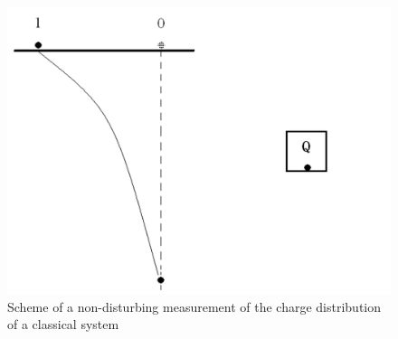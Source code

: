 \begin{center} 
\begin{figure}[h]\label{cmc}

\includegraphics[scale=0.39]{fig61.jpg}


\caption{Scheme of a non-disturbing measurement of the charge distribution of a classical system}

\end{figure}

\end{center} 

